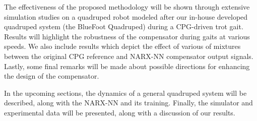 The effectiveness of the proposed methodology will be shown through extensive simulation studies on a quadruped robot modeled after our in-house developed quadruped system (the BlueFoot Quadruped) during a CPG-driven trot gait. Results will highlight the robustness of the compensator during gaits at various speeds. We also include results which depict the effect of various of mixtures between the original CPG reference and NARX-NN compensator output signals. Lastly, some final remarks will be made about possible directions for enhancing the design of the compensator.

In the upcoming sections, the dynamics of a general quadruped system will be described, along with the NARX-NN and its training. Finally, the simulator and experimental data will be presented, along with a discussion of our results.